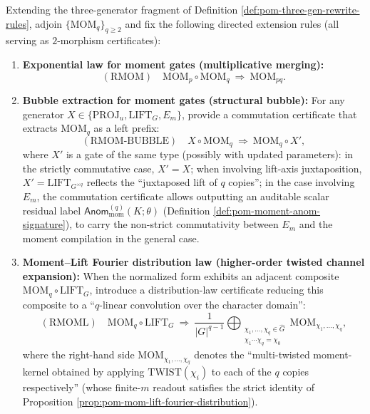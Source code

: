 \begin{definition}\label{def:pom-four-gen-rewrite-rules}
Extending the three-generator fragment of Definition \ref{def:pom-three-gen-rewrite-rules}, adjoin \(\{\mathrm{MOM}_q\}_{q\ge 2}\) and fix the following directed extension rules (all serving as \(2\)-morphism certificates):
\begin{enumerate}
  \item \textbf{Exponential law for moment gates (multiplicative merging):}
  $$
  (\mathrm{RMOM})\quad
  \mathrm{MOM}_p\circ \mathrm{MOM}_q\ \Rightarrow\ \mathrm{MOM}_{pq}.
  $$
  \item \textbf{Bubble extraction for moment gates (structural bubble):}
  For any generator \(X\in\{\mathrm{PROJ}_u,\mathrm{LIFT}_G,E_m\}\), provide a commutation certificate that extracts \(\mathrm{MOM}_q\) as a left prefix:
  $$
  (\mathrm{RMOM\text{-}BUBBLE})\quad
  X\circ \mathrm{MOM}_q\ \Rightarrow\ \mathrm{MOM}_q\circ X',
  $$
  where \(X'\) is a gate of the same type (possibly with updated parameters): in the strictly commutative case, \(X'=X\);
  when involving lift-axis juxtaposition, \(X'=\mathrm{LIFT}_{G^{\times q}}\) reflects the ``juxtaposed lift of \(q\) copies'';
  in the case involving \(E_m\), the commutation certificate allows outputting an auditable scalar residual label
  \(\mathsf{Anom}^{(q)}_{\mathrm{mom}}(K;\theta)\) (Definition \ref{def:pom-moment-anom-signature}), to carry the non-strict commutativity between \(E_m\) and the moment compilation in the general case.
  \item \textbf{Moment--Lift Fourier distribution law (higher-order twisted channel expansion):}
  When the normalized form exhibits an adjacent composite \(\mathrm{MOM}_q\circ \mathrm{LIFT}_G\), introduce a distribution-law certificate reducing this composite to a ``\(q\)-linear convolution over the character domain'':
  \[
  (\mathrm{RMOML})\quad
  \mathrm{MOM}_q\circ \mathrm{LIFT}_G
  \ \Rightarrow\
  \frac{1}{|G|^{q-1}}
  \bigoplus_{\substack{\chi_1,\dots,\chi_q\in\widehat G\\ \chi_1\cdots\chi_q=\chi_0}}
  \mathrm{MOM}_{\chi_1,\dots,\chi_q},
  \]
  where the right-hand side \(\mathrm{MOM}_{\chi_1,\dots,\chi_q}\) denotes the ``multi-twisted moment-kernel obtained by applying \(\mathrm{TWIST}(\chi_i)\) to each of the \(q\) copies respectively'' (whose finite-\(m\) readout satisfies the strict identity of Proposition \ref{prop:pom-mom-lift-fourier-distribution}).

\end{enumerate}
\end{definition}
